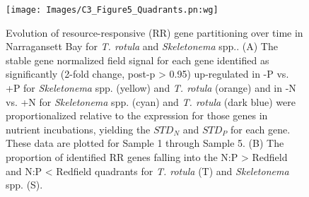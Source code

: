 \begin{figure}[h!]
  \centering
    \texttt{[image: Images/C3\_Figure5\_Quadrants.pn:wg]}
    \caption[Evolution of resource-responsive (RR) gene partitioning over time in Narragansett Bay]{Evolution of resource-responsive (RR) gene partitioning over time in Narragansett Bay for \textit{T. rotula} and \textit{Skeletonema} spp.. (A) The stable gene normalized field signal for each gene identified as significantly (2-fold change, post-p > 0.95) up-regulated in -P vs. +P for \textit{Skeletonema} spp. (yellow) and \textit{T. rotula} (orange) and in -N vs. +N for \textit{Skeletonema} spp. (cyan) and \textit{T. rotula} (dark blue) were proportionalized relative to the expression for those genes in nutrient incubations, yielding the $STD_N$ and $STD_P$ for each gene. These data are plotted for Sample 1 through Sample 5. (B) The proportion of identified RR genes falling into the N:P > Redfield and N:P < Redfield quadrants for \textit{T. rotula} (T) and \textit{Skeletonema} spp. (S).}

  \label{fig:c3f5}
\end{figure}

